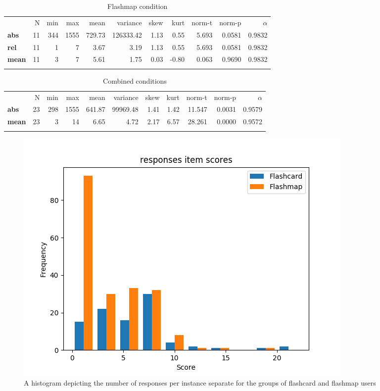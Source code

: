 \begin{longtable}[c]{@{}lrrrrrrrrrr@{}}
\caption{Flashmap condition}
\endfirsthead
\toprule\addlinespace
& N & min & max & mean & variance & skew & kurt & norm-t &
norm-p & $\alpha$
\\\addlinespace
\midrule
\textbf{abs} & 11 & 344 & 1555 & 729.73 & 126333.42 & 1.13 & 0.55 &
5.693 & 0.0581 & 0.9832
\\\addlinespace
\textbf{rel} & 11 & 1 & 7 & 3.67 & 3.19 & 1.13 & 0.55 & 5.693 & 0.0581 &
0.9832
\\\addlinespace
\textbf{mean} & 11 & 3 & 7 & 5.61 & 1.75 & 0.03 & -0.80 & 0.063 & 0.9690
& 0.9832
\\\addlinespace
\bottomrule
    \label{tab:responses_fm}
\end{longtable}

\begin{longtable}[c]{@{}lrrrrrrrrrr@{}}
\caption{Combined conditions}
\endfirsthead
\toprule\addlinespace
& N & min & max & mean & variance & skew & kurt & norm-t &
norm-p & $\alpha$
\\\addlinespace
\midrule
\textbf{abs} & 23 & 298 & 1555 & 641.87 & 99969.48 & 1.41 & 1.42 &
11.547 & 0.0031 & 0.9579
\\\addlinespace
\textbf{mean} & 23 & 3 & 14 & 6.65 & 4.72 & 2.17 & 6.57 & 28.261 &
0.0000 & 0.9572
\\\addlinespace
\bottomrule
    \label{tab:responses_gen}
\end{longtable}

\begin{figure}
    \centering
    \includegraphics[width=.7\textwidth]{img/responses_diff.png}
    \caption{A histogram depicting the number of responses per instance separate for the groups of flashcard and flashmap users}
    \label{fig:responses_diff}
\end{figure}

